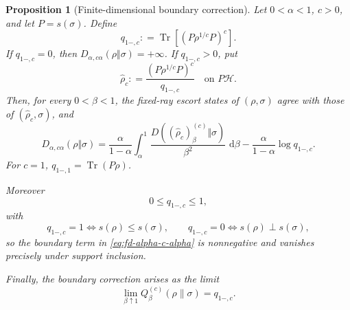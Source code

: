 \documentclass[12pt]{article}
\numberwithin{equation}{section}
\newtheorem{proposition}[theorem]{Proposition}
\theoremstyle{definition}
\theoremstyle{remark}
\newcommand{\dd}{\,\mathrm d}
\newcommand{\?}{\overset{?}{=}}
\newcommand{\defeq}{\mathrel{\mathop:}=}
\DeclareMathOperator{\Tr}{Tr}
\newcommand{\cH}{\mathcal{H}}
\begin{document}
\begin{proposition}[Finite-dimensional boundary correction]
\label{prop:fd-boundary-correction}
Let $0<\alpha<1$, $c>0$, and let $P=s(\sigma)$.  Define
\begin{equation}
  q_{1-,c}
  \defeq \Tr\!\left[(P\rho^{1/c}P)^c\right].
  \label{eq:fd-boundary-overlap}
\end{equation}
If $q_{1-,c}=0$, then
$D_{\alpha,c\alpha}(\rho\Vert\sigma)=+\infty$.  If $q_{1-,c}>0$, put
\begin{equation}
  \widehat\rho_c
  \defeq \frac{(P\rho^{1/c}P)^c}{q_{1-,c}}
  \quad\text{on }P\cH.
  \label{eq:fd-boundary-seed}
\end{equation}
Then, for every $0<\beta<1$, the fixed-ray escort states of $(\rho,\sigma)$ agree with those
of $(\widehat\rho_c,\sigma)$, and
\begin{equation}
  D_{\alpha,c\alpha}(\rho\Vert\sigma)
  =\frac{\alpha}{1-\alpha}
   \int_\alpha^1
   \frac{D((\widehat\rho_c)_\beta^{(c)}\Vert\sigma)}{\beta^2}
   \,\dd\beta
   -\frac{\alpha}{1-\alpha}\log q_{1-,c}.
  \label{eq:fd-alpha-c-alpha}
\end{equation}
For $c=1$, $q_{1-,1}=\Tr(P\rho)$. 

Moreover
\begin{equation}\label{eq:qbound}
  0\le q_{1-,c}\le1, 
\end{equation}
with
\begin{equation}\label{eq:endpoint-bounds}
    q_{1-,c}=1\iff s(\rho)\le s(\sigma), \qquad q_{1-,c}=0\iff s(\rho)\perp s(\sigma),
\end{equation}
so the boundary term in \eqref{eq:fd-alpha-c-alpha} is nonnegative and vanishes precisely under support inclusion.

Finally, the boundary correction arises as the limit
\begin{equation}\label{eq:endpointjump}
  \lim_{\beta\uparrow1}Q^{(c)}_{\beta}(\rho\|\sigma)=q_{1-,c}.
\end{equation}
\end{proposition}
\end{document}
